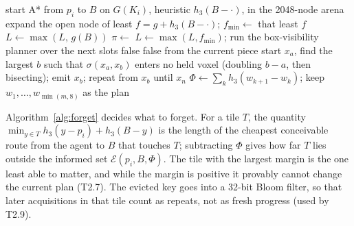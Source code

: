 \documentclass[11pt,a4paper]{article}
\newcommand{\Vs}{V^\star}
\newcommand{\E}{\mathcal E}
\begin{document}
\begin{algorithm}[htbp]
\caption{\textsc{PlanStep}: exact search sliced over slots (steps 4--5)}\label{alg:plan}
\begin{algorithmic}[1]
   start A* from $p_i$ to $B$ on $G(K_i)$, heuristic $h_3(B-\cdot)$, in the 2048-node arena
  \EndIf
    \State expand the open node of least $f=g+h_3(B-\cdot)$;\; $f_{\min}\gets$ that least $f$
      \State $L\gets\max(L,\,g(B))$ \Comment{$g(B)=d_{K_i}(p_i)\le\Vs(p_i)$: T2.6}
      \State $\pi\gets$ 
      \State \Return {}
      \State $L\gets\max(L,f_{\min})$;\; run the box-visibility planner over the next slots 
      \State \Return false
     \Return {} 
    \EndIf
  \EndWhile
  \State \Return false 
\EndFunction
{} 
  \State from the current piece start $x_a$, find the largest $b$ such that $\sigma(x_a,x_b)$ enters no held voxel
  (doubling $b-a$, then bisecting); emit $x_b$; repeat from $x_b$ until $x_n$
\EndFunction
{}
  \State $\Phi\gets\sum_kh_3(w_{k+1}-w_k)$;\; keep $w_1,\dots,w_{\min(m,8)}$ as the plan 
\EndFunction
\end{algorithmic}
\end{algorithm}

Algorithm~\ref{alg:forget} decides what to forget. For a tile $T$, the quantity
$\min_{y\in T}h_3(y-p_i)+h_3(B-y)$ is the length of the cheapest conceivable route from the agent to $B$ that touches
$T$; subtracting $\Phi$ gives how far $T$ lies outside the informed set $\E(p_i,B,\Phi)$. The tile with the largest
margin is the one least able to matter, and while the margin is positive it provably cannot change the current plan
(T2.7). The evicted key goes into a 32-bit Bloom filter, so that later acquisitions in that tile count as repeats, not
as fresh progress (used by T2.9).
\end{document}
